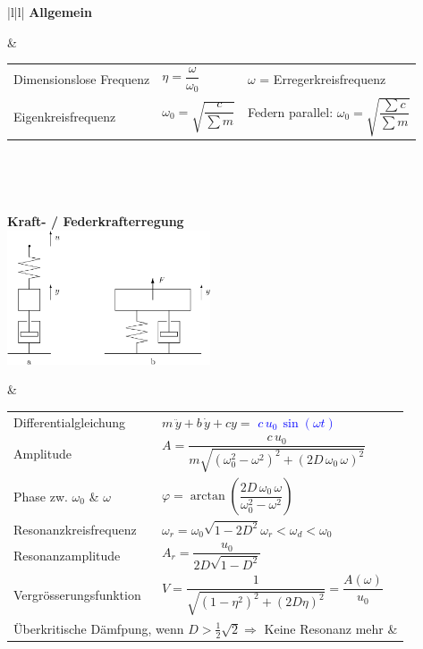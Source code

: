 \begin{tabular}{|l|l|}
\hline
\textbf{Allgemein}

	& \begin{minipage}[]{12cm}
      \renewcommand{\arraystretch}{2}      
		\begin{tabular}{lll}
    	Dimensionslose Frequenz
    		& $\eta=\dfrac{\omega}{\omega_0}$ 
			& $\omega$ = Erregerkreisfrequenz \\
    	Eigenkreisfrequenz
    		& $\omega_0 = \sqrt{\dfrac{c}{\sum m}}$
			& Federn parallel: $\omega_0 =
    		\sqrt{\dfrac{\sum c}{\sum m}}$
		\end{tabular} \\
    \end{minipage} \\
\hline
\hline
\parbox{6cm}{
	\textbf{Kraft- / Federkrafterregung}\\
	\includegraphics[width=6cm]{./bilder/federkrafterregung.png}}
	& \begin{minipage}[]{12cm}
      \renewcommand{\arraystretch}{2}      
		\begin{tabular}{ll}
    	Differentialgleichung
    		& $m \, \ddot{y} + b \, \dot{y} + c y=$
    		\textcolor{blue}{$c \, u_0 \, \sin(\omega t)$} \\
    	Amplitude
    		&
    		$A=\dfrac{c\,u_0}{m\sqrt{(\omega_0^2-\omega^2)^2+(2D\,\omega_0\,\omega)^2}}$ \\
    	Phase zw. $\omega_0$ \& $\omega$
    		&
    		$\varphi=\arctan\left(\dfrac{2D\,\omega_0\,\omega}{\omega_0^2-\omega^2}\right)$\\ 
    	Resonanzkreisfrequenz
    		& $\omega_r=\omega_0\sqrt{1-2D^2}$\quad $\omega_r<\omega_d<\omega_0$\\
    	Resonanzamplitude
    		& $A_r=\dfrac{u_0}{2D\sqrt{1-D^2}}$\\
    	Vergrösserungsfunktion
    		&
    		$V=\dfrac{1}{\sqrt{(1-\eta^2)^2+(2D\eta)^2}}=\dfrac{A(\omega)}{u_0}$ \\ 
    	\multicolumn{2}{l}{\small
    	Überkritische Dämfpung, wenn $D > \frac12 \sqrt2 \Rightarrow$ Keine
    	Resonanz mehr \&} \\

\end{tabular}
\end{minipage}
\end{tabular}
